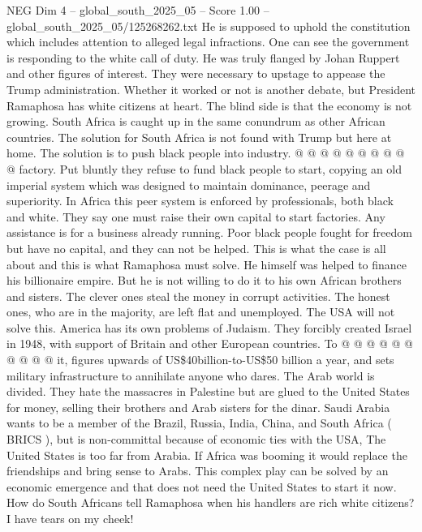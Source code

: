 \begin{textsample}{NEG Dim 4 – global\_south\_2025\_05 – Score 1.00 – global\_south\_2025\_05/125268262.txt}
He is supposed to uphold the constitution which includes attention to alleged legal infractions.
One can see the government is responding to the white call of duty.
He was truly flanged by Johan Ruppert and other figures of interest.
They were necessary to upstage to appease the Trump administration.
Whether it worked or not is another debate, but President Ramaphosa has white citizens at heart.
The blind side is that the economy is not growing.
South Africa is caught up in the same conundrum as other African countries.
The solution for South Africa is not found with Trump but here at home.
The solution is to push black people into industry. @ @ @ @ @ @ @ @ @ @ factory.
Put bluntly they refuse to fund black people to start, copying an old imperial system which was designed to maintain dominance, peerage and superiority.
In Africa this peer system is enforced by professionals, both black and white.
They say one must raise their own capital to start factories.
Any assistance is for a business already running.
Poor black people fought for freedom but have no capital, and they can not be helped.
This is what the case is all about and this is what Ramaphosa must solve.
He himself was helped to finance his billionaire empire.
But he is not willing to do it to his own African brothers and sisters.
The clever ones steal the money in corrupt activities.
The honest ones, who are in the majority, are left flat and unemployed.
The USA will not solve this.
America has its own problems of Judaism.
They forcibly created Israel in 1948, with support of Britain and other European countries.
To @ @ @ @ @ @ @ @ @ @ it, figures upwards of US\$40billion-to-US\$50 billion a year, and sets military infrastructure to annihilate anyone who dares.
The Arab world is divided.
They hate the massacres in Palestine but are glued to the United States for money, selling their brothers and Arab sisters for the dinar.
Saudi Arabia wants to be a member of the Brazil, Russia, India, China, and South Africa ( BRICS ), but is non-committal because of economic ties with the USA, The United States is too far from Arabia.
If Africa was booming it would replace the friendships and bring sense to Arabs.
This complex play can be solved by an economic emergence and that does not need the United States to start it now.
How do South Africans tell Ramaphosa when his handlers are rich white citizens?
I have tears on my cheek!

\end{textsample}

